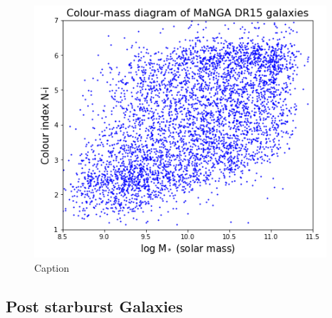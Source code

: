 \begin{figure}
    \centering
    \includegraphics[width=\columnwidth]{images/CMDs/CMD-mass-1.png}
    \caption{Caption}
    \label{fig:CMD-mass-1}
\end{figure}

\subsection{Post starburst Galaxies}

